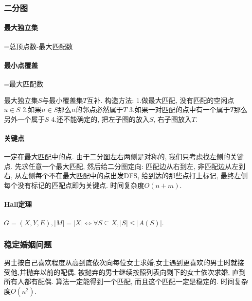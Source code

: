 \subsubsection{二分图}
        \paragraph{最大独立集}=总顶点数-最大匹配数
        \paragraph{最小点覆盖}=最大匹配数

        最大独立集$S$与最小覆盖集$T$互补. 构造方法: 1.做最大匹配, 没有匹配的空闲点$u\in S$ 2.如果$u\in S$那么$u$的邻点必然属于$T$ 3.如果一对匹配的点中有一个属于$T$那么另外一个属于$S$ 4.还不能确定的, 把左子图的放入$S$, 右子图放入$T$.
        \paragraph{关键点} 一定在最大匹配中的点. 由于二分图左右两侧是对称的, 我们只考虑找左侧的关键点. 先求任意一个最大匹配, 然后给二分图定向: 匹配边从右到左, 非匹配边从左到右, 从左侧每个不在最大匹配中的点出发DFS, 给到达的那些点打上标记, 最终左侧每个没有标记的匹配点即为关键点. 时间复杂度$O(n+m)$. 
        \paragraph{Hall定理}$G=(X,Y,E), |M|=|X| \Leftrightarrow \forall S \subseteq X, |S| \leq |A(S)|$. 

\subsubsection{稳定婚姻问题}
         男士按自己喜欢程度从高到底依次向每位女士求婚,女士遇到更喜欢的男士时就接受他,并抛弃以前的配偶. 被抛弃的男士继续按照列表向剩下的女士依次求婚, 直到所有人都有配偶. 算法一定能得到一个匹配, 而且这个匹配一定是稳定的. 时间复杂度$O(n^2)$. 

